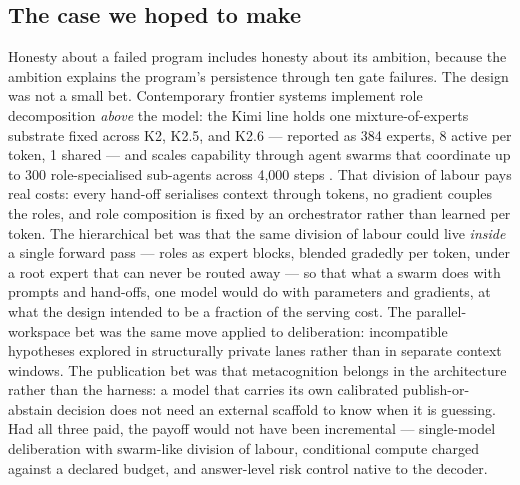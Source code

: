 \documentclass[10pt,a4paper]{article}
\begin{document}
\subsection{The case we hoped to make}\label{sec:ambition}

Honesty about a failed program includes honesty about its ambition, because
the ambition explains the program's persistence through ten gate failures.
The design was not a small bet. Contemporary frontier systems implement role
decomposition \emph{above} the model: the Kimi line holds one
mixture-of-experts substrate fixed across K2, K2.5, and K2.6 --- reported as
384 experts, 8 active per token, 1 shared --- and scales capability through agent swarms
that coordinate up to 300 role-specialised sub-agents across 4{,}000 steps
\cite{kimik2report,kimik26card,marktechpost2026k26,pandaily2026k3}. That
division of labour pays real costs: every hand-off serialises context through
tokens, no gradient couples the roles, and role composition is fixed by an
orchestrator rather than learned per token. The hierarchical bet was that the
same division of labour could live \emph{inside} a single forward pass ---
roles as expert blocks, blended gradedly per token, under a root expert that
can never be routed away --- so that what a swarm does with prompts and
hand-offs, one model would do with parameters and gradients, at what the
design intended to be a fraction of the serving cost. The parallel-workspace bet was the same move applied to
deliberation: incompatible hypotheses explored in structurally private lanes
rather than in separate context windows. The publication bet was that
metacognition belongs in the architecture rather than the harness: a model
that carries its own calibrated publish-or-abstain decision does not need an
external scaffold to know when it is guessing. Had all three paid, the payoff
would not have been incremental --- single-model deliberation with swarm-like
division of labour, conditional compute charged against a declared budget,
and answer-level risk control native to the decoder.
\end{document}
